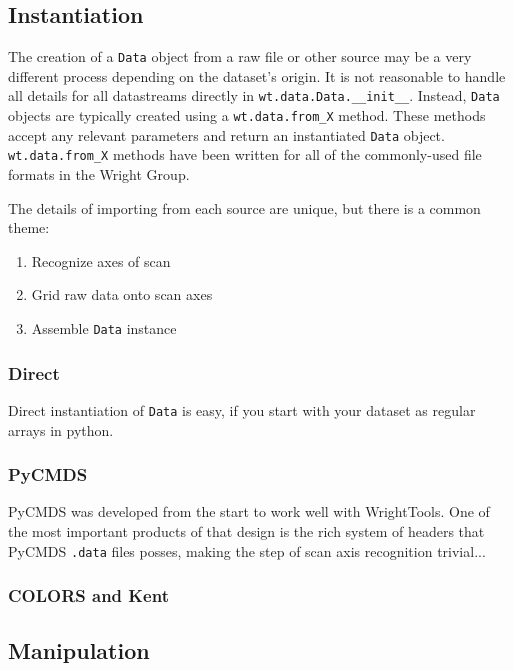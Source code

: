 \documentclass[11pt]{article}
\begin{document}
\subsection{Instantiation}\label{section:instantiation}

The creation of a \texttt{Data} object from a raw file or other source may be a very different process depending on the dataset's origin. It is not reasonable to handle all details for all datastreams directly in \texttt{wt.data.Data.\_\_init\_\_}. Instead, \texttt{Data} objects are typically created using a \texttt{wt.data.from\_X} method. These methods accept any relevant parameters and return an instantiated \texttt{Data} object. \texttt{wt.data.from\_X} methods have been written for all of the commonly-used file formats in the Wright Group.

The details of importing from each source are unique, but there is a common theme:
\begin{enumerate}
	\item Recognize axes of scan
	\item Grid raw data onto scan axes
	\item Assemble \texttt{Data} instance
\end{enumerate} 

\subsubsection{Direct}

Direct instantiation of \texttt{Data} is easy, if you start with your dataset as regular arrays in python. 

\subsubsection{PyCMDS}

PyCMDS was developed from the start to work well with WrightTools. One of the most important products of that design is the rich system of headers that PyCMDS \texttt{.data} files posses, making the step of scan axis recognition trivial...

\subsubsection{COLORS and Kent}

\subsection{Manipulation}
\end{document}
